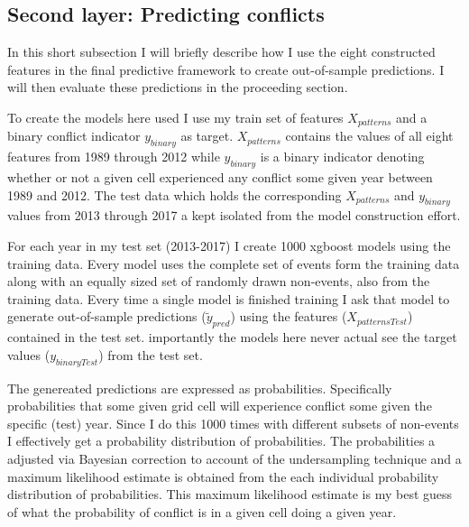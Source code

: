 \documentclass[a4paper]{article}
\begin{document}

\subsection{Second layer: Predicting conflicts}

In this short subsection I will briefly describe how I use the eight constructed features in the final predictive framework to create out-of-sample predictions. I will then evaluate these predictions in the proceeding section.\par

To create the models here used I use my train set of features $X_{patterns}$ and a binary conflict indicator $y_{binary}$ as target. $X_{patterns}$ contains the values of all eight features from 1989 through 2012 while $y_{binary}$ is a binary indicator denoting whether or not a given cell experienced any conflict some given year between 1989 and 2012. The test data which holds the corresponding $X_{patterns}$ and $y_{binary}$ values from 2013 through 2017 a kept isolated from the model construction effort.\par

For each year in my test set (2013-2017) I create 1000 xgboost models using the training data. Every model uses the complete set of events form the training data along with an equally sized set of randomly drawn non-events, also from the training data. Every time a single model is finished training I ask that model to generate out-of-sample predictions ($\tilde{y}_{pred}$) using the features ($X_{patternsTest}$) contained in the test set. importantly the models here never actual see the target values ($y_{binaryTest}$) from the test set.\par

The genereated predictions are expressed as probabilities. Specifically probabilities that some given grid cell will experience conflict some given the specific (test) year. Since I do this 1000 times with different subsets of non-events I effectively get a probability distribution of probabilities. The probabilities a adjusted via Bayesian correction to account of the undersampling technique and a maximum likelihood estimate is obtained from the each individual probability distribution of probabilities. This maximum likelihood estimate is my best guess of what the probability of conflict is in a given cell doing a given year.\par 
\end{document}
